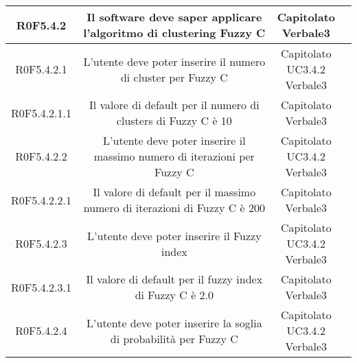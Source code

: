 \begin{center}
\begin{longtable}{|c|c|c|c|}
\hline
R0F5.4.2   & \parbox[t]{\larghezza}{Il software deve saper applicare l'algoritmo di clustering\glossario{} Fuzzy C\glossario{}}  & \parbox[t]{\dimFonti}{ Capitolato \\ Verbale3 \\} \\
\hline
R0F5.4.2.1   & \parbox[t]{\larghezza}{L'utente deve poter inserire il numero di cluster\glossario{} per Fuzzy C\glossario{}}  & \parbox[t]{\dimFonti}{ Capitolato \\ UC3.4.2 \\ Verbale3 \\} \\
\hline
R0F5.4.2.1.1   & \parbox[t]{\larghezza}{Il valore di default per il numero di clusters di Fuzzy C\glossario{} è 10}  & \parbox[t]{\dimFonti}{ Capitolato \\ Verbale3 \\} \\
\hline
R0F5.4.2.2   & \parbox[t]{\larghezza}{L'utente deve poter inserire il massimo numero di iterazioni per Fuzzy C\glossario{}}  & \parbox[t]{\dimFonti}{ Capitolato \\ UC3.4.2 \\ Verbale3 \\} \\
\hline
R0F5.4.2.2.1   & \parbox[t]{\larghezza}{Il valore di default per il massimo numero di iterazioni di Fuzzy C\glossario{} è 200}  & \parbox[t]{\dimFonti}{ Capitolato \\ Verbale3 \\} \\
\hline
R0F5.4.2.3   & \parbox[t]{\larghezza}{L'utente deve poter inserire il Fuzzy index}  & \parbox[t]{\dimFonti}{ Capitolato \\ UC3.4.2 \\ Verbale3 \\} \\
\hline
R0F5.4.2.3.1   & \parbox[t]{\larghezza}{Il valore di default per il fuzzy index di Fuzzy C\glossario{} è 2.0}  & \parbox[t]{\dimFonti}{ Capitolato \\ Verbale3 \\} \\
\hline
R0F5.4.2.4   & \parbox[t]{\larghezza}{L'utente deve poter inserire la soglia di probabilità per Fuzzy C\glossario{}}  & \parbox[t]{\dimFonti}{ Capitolato \\ UC3.4.2 \\ Verbale3 \\} \\
\hline

\end{longtable}
\end{center}
